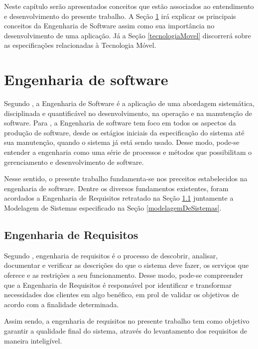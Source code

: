 Neste capítulo serão apresentados conceitos que estão associados ao entendimento e desenvolvimento do presente trabalho. A Seção \ref{engenhariaDeSoftware} irá explicar os principais conceitos da Engenharia de Software assim como sua importância no desenvolvimento de uma aplicação. Já a Seção \ref{tecnologiaMovel} discorrerá sobre as especificações relacionadas à Tecnologia Móvel.

\section{Engenharia de software}
\label{engenhariaDeSoftware}

Segundo , a Engenharia de Software é a aplicação de uma abordagem sistemática, disciplinada e quantificável no desenvolvimento, na operação e na manutenção de software. Para , a Engenharia de software tem foco em todos os aspectos da produção de software, desde os estágios iniciais da especificação do sistema até sua manutenção, quando o sistema já está sendo usado. Desse modo, pode-se entender a engenharia como uma série de processos e métodos que possibilitam o gerenciamento e desenvolvimento de software.

Nesse sentido, o presente trabalho fundamenta-se nos preceitos estabelecidos na engenharia de software. Dentre os diversos fundamentos existentes, foram acordados a Engenharia de Requisitos retratado na Seção \ref{engenhariaDeRequisitos} juntamente a Modelagem de Sistemas especificado na Seção \ref{modelagemDeSistemas}.

\subsection{Engenharia de Requisitos}
\label{engenhariaDeRequisitos}

Segundo , engenharia de requisitos é o processo de descobrir, analisar, documentar e verificar as descrições do que o sistema deve fazer, os serviços que oferece e as restrições a seu funcionamento. Desse modo, pode-se compreender que a Engenharia de Requisitos é responsável por identificar e transformar necessidades dos clientes em algo benéfico, em prol de validar os objetivos de acordo com a finalidade determinada.

Assim sendo, a engenharia de requisitos no presente trabalho tem como objetivo garantir a qualidade final do sistema, através do levantamento dos requisitos de maneira inteligível.

